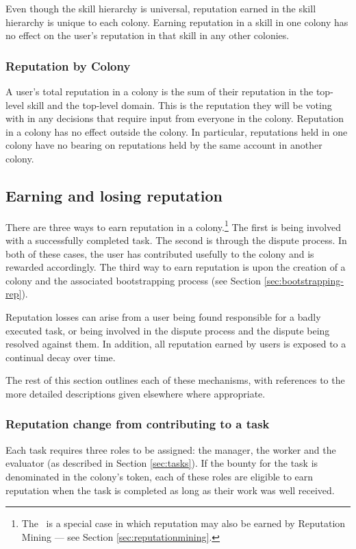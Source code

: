 Even though the skill hierarchy is universal, reputation earned in the skill hierarchy is unique to each colony. Earning reputation in a skill in one colony has no effect on the user's reputation in that skill in any other colonies.

\subsubsection{Reputation by Colony}\label{sec:rep-by-colony}
A user's total reputation in a colony is the sum of their reputation in the top-level skill and the top-level domain. This is the reputation they will be voting with in any decisions that require input from everyone in the colony. Reputation in a colony has no effect outside the colony. In particular, reputations held in one colony have no bearing on reputations held by the same account in another colony.

\subsection{Earning and losing reputation}\label{sec:earning-losing-rep}
There are three ways to earn reputation in a colony.\footnote{The \rc\ is a special case in which reputation may also be earned by Reputation Mining --- see Section \ref{sec:reputationmining}.} The first is being involved with a successfully completed task. The second is through the dispute process. In both of these cases, the user has contributed usefully to the colony and is rewarded accordingly. The third way to earn reputation is upon the creation of a colony and the associated bootstrapping process (see Section \ref{sec:bootstrapping-rep}).

Reputation losses can arise from a user being found responsible for a badly executed task, or being involved in the dispute process and the dispute being resolved against them. In addition, all reputation earned by users is exposed to a continual decay over time. 

The rest of this section outlines each of these mechanisms, with references to the more detailed descriptions given elsewhere where appropriate.

\subsubsection{Reputation change from contributing to a task}\label{sec:earning-rep-from-task}
Each task requires three roles to be assigned: the manager, the worker and the evaluator (as described in Section \ref{sec:tasks}). If the bounty for the task is denominated in the colony's token, each of these roles are eligible to earn reputation when the task is completed as long as their work was well received.


